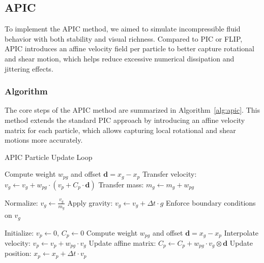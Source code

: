 \subsection{APIC}
To implement the APIC method, we aimed to simulate incompressible fluid behavior with both stability and visual richness. Compared to PIC or FLIP, APIC introduces an affine velocity field per particle to better capture rotational and shear motion, which helps reduce excessive numerical dissipation and jittering effects.

\subsubsection{Algorithm}

The core steps of the APIC method are summarized in Algorithm~\ref{alg:apic}. This method extends the standard PIC approach by introducing an affine velocity matrix for each particle, which allows capturing local rotational and shear motions more accurately.

\begin{algorithm}[h]
\caption{APIC Particle Update Loop}\label{alg:apic}
\begin{algorithmic}[1]

        \State Compute weight $w_{pg}$ and offset $\mathbf{d} = x_g - x_p$
        \State Transfer velocity: $v_g \gets v_g + w_{pg} \cdot (v_p + C_p \cdot \mathbf{d})$
        \State Transfer mass: $m_g \gets m_g + w_{pg}$
    \EndFor
\EndFor

        \State Normalize: $v_g \gets \frac{v_g}{m_g}$
    \EndIf
    \State Apply gravity: $v_g \gets v_g + \Delta t \cdot g$
    \State Enforce boundary conditions on $v_g$
\EndFor

    \State Initialize: $v_p \gets 0$, $C_p \gets 0$
        \State Compute weight $w_{pg}$ and offset $\mathbf{d} = x_g - x_p$
        \State Interpolate velocity: $v_p \gets v_p + w_{pg} \cdot v_g$
        \State Update affine matrix: $C_p \gets C_p + w_{pg} \cdot v_g \otimes \mathbf{d}$
    \EndFor
    \State Update position: $x_p \gets x_p + \Delta t \cdot v_p$
\EndFor
\end{algorithmic}
\end{algorithm}

